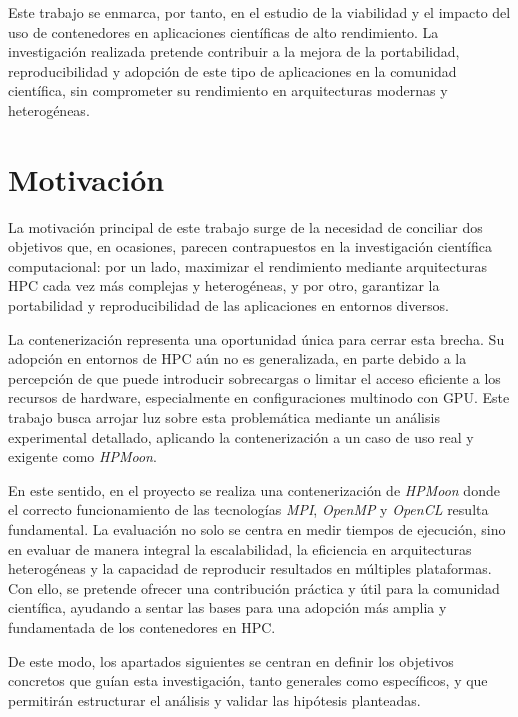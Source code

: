 Este trabajo se enmarca, por tanto, en el estudio de la viabilidad y el impacto del uso de contenedores en aplicaciones científicas de alto rendimiento. La investigación realizada pretende contribuir a la mejora de la portabilidad, reproducibilidad y adopción de este tipo de aplicaciones en la comunidad científica, sin comprometer su rendimiento en arquitecturas modernas y heterogéneas.

\section{Motivación}\label{sec:motivacion}


La motivación principal de este trabajo surge de la necesidad de conciliar dos objetivos que, en ocasiones, parecen contrapuestos en la investigación científica computacional: por un lado, maximizar el rendimiento mediante arquitecturas \acs{HPC} cada vez más complejas y heterogéneas, y por otro, garantizar la portabilidad y reproducibilidad de las aplicaciones en entornos diversos.

La contenerización representa una oportunidad única para cerrar esta brecha. Su adopción en entornos de \acs{HPC} aún no es generalizada, en parte debido a la percepción de que puede introducir sobrecargas o limitar el acceso eficiente a los recursos de hardware, especialmente en configuraciones multinodo con \acs{GPU}. Este trabajo busca arrojar luz sobre esta problemática mediante un análisis experimental detallado, aplicando la contenerización a un caso de uso real y exigente como \textit{HPMoon}.

En este sentido, en el proyecto se realiza una contenerización de \textit{HPMoon} donde el correcto funcionamiento de las tecnologías \textit{MPI}, \textit{OpenMP} y \textit{OpenCL} resulta fundamental. La evaluación no solo se centra en medir tiempos de ejecución, sino en evaluar de manera integral la escalabilidad, la eficiencia en arquitecturas heterogéneas y la capacidad de reproducir resultados en múltiples plataformas. Con ello, se pretende ofrecer una contribución práctica y útil para la comunidad científica, ayudando a sentar las bases para una adopción más amplia y fundamentada de los contenedores en \acs{HPC}.

De este modo, los apartados siguientes se centran en definir los objetivos concretos que guían esta investigación, tanto generales como específicos, y que permitirán estructurar el análisis y validar las hipótesis planteadas.

